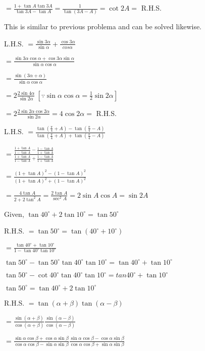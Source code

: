   $= \frac{1 + \tan A \tan 3A}{\tan 3A - \tan A} = \frac{1}{\tan(3A - A)} = \cot 2A =$ R.H.S.

\item This is similar to previous problema and can be solved likewise.

\item L.H.S. $= \frac{\sin 3\alpha}{\sin\alpha} + \frac{\cos 3\alpha}{cos\alpha}$

  $= \frac{\sin3\alpha\cos\alpha + \cos3\alpha\sin\alpha}{\sin\alpha\cos\alpha}$

  $= \frac{\sin(3\alpha + \alpha)}{\sin\alpha\cos\alpha}$

  $=2\frac{2\sin 4\alpha}{\sin2\alpha}~[\because \sin\alpha\cos\alpha = \frac{1}{2}\sin2\alpha]$

  $= 2\frac{2\sin2\alpha\cos2\alpha}{\sin2\alpha} = 4\cos2\alpha =$ R.H.S.

\item L.H.S. $= \frac{\tan\left(\frac{\pi}{4} + A \right) - \tan\left(\frac{\pi}{4} - A\right)}{\tan\left(\frac{\pi}{4} + A\right) +
  \tan\left(\frac{\pi}{4} - A\right)}$

  $= \frac{\frac{1 + \tan A}{1 - \tan A} - \frac{1 - \tan A}{1 + \tan A}}{\frac{1 + \tan A}{1 - \tan A} + \frac{1 - \tan
    A}{1 + \tan A}}$

  $= \frac{(1 + \tan A)^2 - (1 - \tan A)^2}{(1 + \tan A)^2 + (1 - \tan A)^2}$

  $= \frac{4\tan A}{2 + 2\tan^2A} = \frac{2\tan A}{\sec^2A} = 2\sin A\cos A = \sin 2A$

\item Given, $\tan 40^\circ + 2 \tan 10^\circ = \tan 50^\circ$

  R.H.S. $= \tan 50^\circ = \tan(40^\circ + 10^\circ)$

  $= \frac{\tan 40^\circ + \tan 10^\circ}{1 - \tan 40^\circ\tan 10^\circ}$

  $\tan50^\circ - \tan50^\circ\tan40^\circ\tan10^\circ = \tan 40^\circ + \tan 10^\circ$

  $\tan50^\circ - \cot40^\circ\tan40^\circ\tan10^\circ = tan40^\circ + \tan10^\circ$

  $\tan50^\circ = \tan 40^\circ + 2 \tan 10^\circ$

\item R.H.S. $= \tan(\alpha + \beta)\tan(\alpha - \beta)$

  $= \frac{\sin(\alpha + \beta)}{\cos(\alpha + \beta)}\frac{\sin(\alpha -\beta)}{\cos(\alpha - \beta)}$

  $= \frac{\sin\alpha\cos\beta + \cos\alpha\sin\beta}{\cos\alpha\cos\beta - \sin\alpha\sin\beta}\frac{\sin\alpha\cos\beta -
  \cos\alpha\sin\beta}{\cos\alpha\cos\beta + \sin\alpha\sin\beta}$

